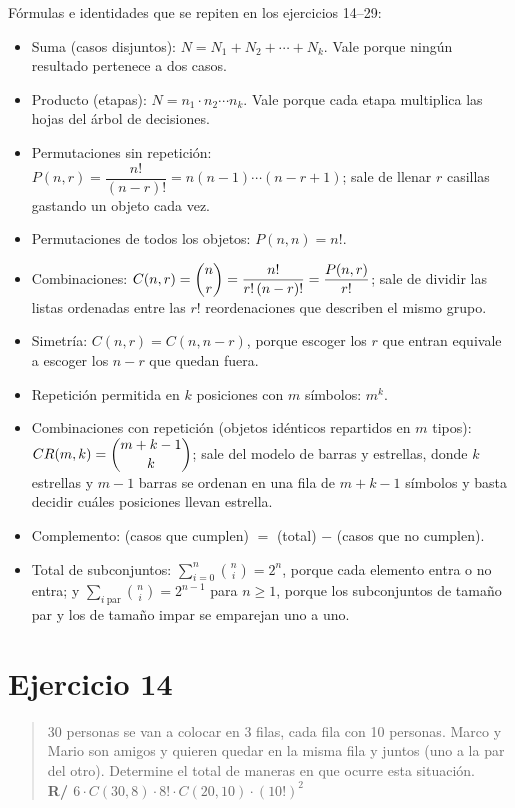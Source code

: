 \documentclass[11pt]{article}
\begin{document}
\begin{tip}
Fórmulas e identidades que se repiten en los ejercicios 14--29:
\begin{itemize}[leftmargin=*]
  \item Suma (casos disjuntos): $N=N_1+N_2+\cdots+N_k$. Vale porque ningún resultado pertenece a dos casos.
  \item Producto (etapas): $N=n_1\cdot n_2\cdots n_k$. Vale porque cada etapa multiplica las hojas del árbol de decisiones.
  \item Permutaciones sin repetición: $P(n,r)=\dfrac{n!}{(n-r)!}=n(n-1)\cdots(n-r+1)$; sale de llenar $r$ casillas gastando un objeto cada vez.
  \item Permutaciones de todos los objetos: $P(n,n)=n!$.
  \item Combinaciones: $C(n,r)=\dbinom{n}{r}=\dfrac{n!}{r!\,(n-r)!}=\dfrac{P(n,r)}{r!}$; sale de dividir las listas ordenadas entre las $r!$ reordenaciones que describen el mismo grupo.
  \item Simetría: $C(n,r)=C(n,n-r)$, porque escoger los $r$ que entran equivale a escoger los $n-r$ que quedan fuera.
  \item Repetición permitida en $k$ posiciones con $m$ símbolos: $m^k$.
  \item Combinaciones con repetición (objetos idénticos repartidos en $m$ tipos): $CR(m,k)=\dbinom{m+k-1}{k}$; sale del modelo de barras y estrellas, donde $k$ estrellas y $m-1$ barras se ordenan en una fila de $m+k-1$ símbolos y basta decidir cuáles posiciones llevan estrella.
  \item Complemento: (casos que cumplen) $=$ (total) $-$ (casos que no cumplen).
  \item Total de subconjuntos: $\displaystyle\sum_{i=0}^{n}\binom{n}{i}=2^{n}$, porque cada elemento entra o no entra; y $\displaystyle\sum_{i\ \text{par}}\binom{n}{i}=2^{n-1}$ para $n\ge 1$, porque los subconjuntos de tamaño par y los de tamaño impar se emparejan uno a uno.
\end{itemize}
\end{tip}

\section*{Ejercicio 14}

\begin{quote}
30 personas se van a colocar en 3 filas, cada fila con 10 personas. Marco y Mario son amigos y quieren quedar en la misma fila y juntos (uno a la par del otro). Determine el total de maneras en que ocurre esta situación.\\[2pt]
\textbf{R/ $6\cdot C(30,8)\cdot 8!\cdot C(20,10)\cdot (10!)^2$}
\end{quote}
\end{document}
